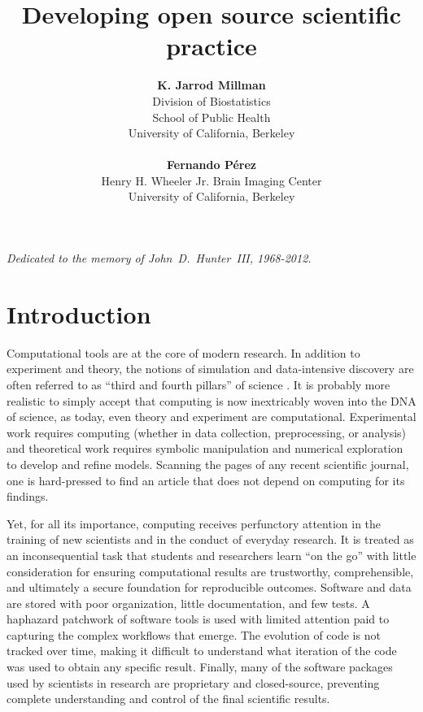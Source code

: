 \documentclass[11pt,oneside,english]{article}
\begin{document}
\title{Developing open source scientific practice}


\author{\textbf{K. Jarrod Millman} \\
Division of Biostatistics\\
School of Public Health\\
University of California, Berkeley
\\\vspace*{1mm}\\
\textbf{Fernando Pérez}\\
Henry H. Wheeler Jr. Brain Imaging Center\\
University of California, Berkeley}


\maketitle


\begin{flushright}
\emph{Dedicated to the memory of John~D.~Hunter~III, 1968-2012.}
\end{flushright} 

\tableofcontents

\section{Introduction}\label{intro}

Computational tools are at the core of modern research. In addition to
experiment and theory, the notions of simulation and data-intensive discovery
are often referred to as ``third and fourth pillars'' of science
\cite{4th-paradigm}.  It is probably more realistic to simply accept that
computing is now inextricably woven into the DNA of science, as today, even
theory and experiment are computational.  Experimental work requires computing
(whether in data collection, preprocessing, or analysis) and theoretical work
requires symbolic manipulation and numerical exploration to develop and refine
models. Scanning the pages of any recent scientific journal, one is
hard-pressed to find an article that does not depend on computing for its
findings.

Yet, for all its importance, computing receives perfunctory attention in the
training of new scientists and in the conduct of everyday research.  It is
treated as an inconsequential task that students and researchers learn ``on the
go'' with little consideration for ensuring computational results are
trustworthy, comprehensible, and ultimately a secure foundation for
reproducible outcomes.  Software and data are stored with poor organization,
little documentation, and few tests.  A haphazard patchwork of software tools
is used with limited attention paid to capturing the complex workflows that
emerge.  The evolution of code is not tracked over time, making it difficult to
understand what iteration of the code was used to obtain any specific result.
Finally, many of the software packages used by scientists in research are
proprietary and closed-source, preventing complete understanding and control of
the final scientific results.
\end{document}
